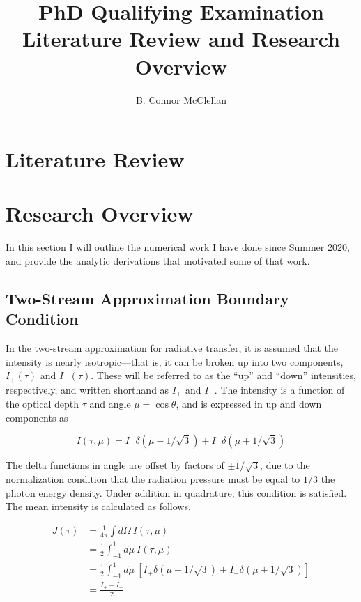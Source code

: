 \documentclass[onecolumn]{aastex63}
\begin{document}
\title{PhD Qualifying Examination \\ \small{\normalfont Literature Review and Research Overview}}
\author{B. Connor McClellan}
\keywords{}

\tableofcontents

\section{Literature Review}

\section{Research Overview}

In this section I will outline the numerical work I have done since Summer 2020, and provide the analytic derivations that motivated some of that work.

\subsection{Two-Stream Approximation Boundary Condition}

In the two-stream approximation for radiative transfer, it is assumed that the intensity is nearly isotropic---that is, it can be broken up into two components, $I_+(\tau)$ and $I_-(\tau)$. These will be referred to as the ``up'' and ``down'' intensities, respectively, and written shorthand as $I_+$ and $I_-$. The intensity is a function of the optical depth $\tau$ and angle $\mu = \cos{\theta}$, and is expressed in up and down components as

\begin{equation}
    I(\tau, \mu) = I_+ \delta(\mu - 1/\sqrt{3}) + I_- \delta(\mu + 1/\sqrt{3})
\end{equation}

The delta functions in angle are offset by factors of $\pm 1/\sqrt{3}$, due to the normalization condition that the radiation pressure must be equal to $1/3$ the photon energy density. Under addition in quadrature, this condition is satisfied. The mean intensity is calculated as follows.

\begin{equation}
    \begin{split}
    J(\tau) &= \frac{1}{4\pi}\int d\Omega\ I(\tau, \mu)\\ 
    &= \frac{1}{2}\int_{-1}^1 d\mu\ I(\tau, \mu)\\
    &= \frac{1}{2}\int_{-1}^1 d\mu\ \left[I_+ \delta(\mu - 1/\sqrt{3}) + I_- \delta(\mu + 1/\sqrt{3})\right]\\
    &= \frac{I_+ + I_-}{2}
    \end{split}
\end{equation}
\end{document}

